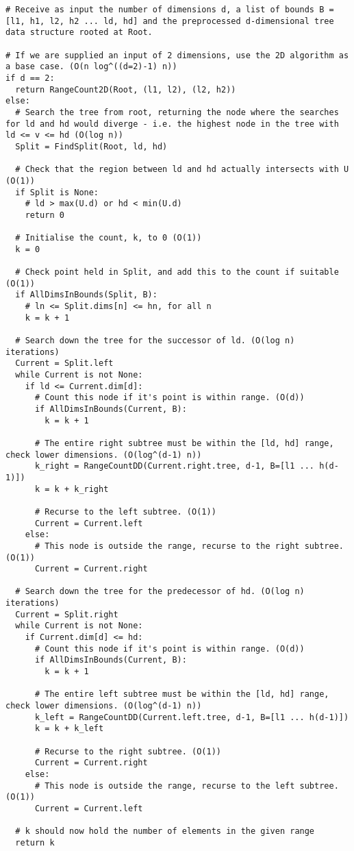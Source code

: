 \documentclass[paper=a4, fontsize=12pt]{article}
\begin{document}
\begin{lstlisting}
# Receive as input the number of dimensions d, a list of bounds B = [l1, h1, l2, h2 ... ld, hd] and the preprocessed d-dimensional tree data structure rooted at Root.

# If we are supplied an input of 2 dimensions, use the 2D algorithm as a base case. (O(n log^((d=2)-1) n))
if d == 2:
  return RangeCount2D(Root, (l1, l2), (l2, h2))
else:
  # Search the tree from root, returning the node where the searches for ld and hd would diverge - i.e. the highest node in the tree with ld <= v <= hd (O(log n))
  Split = FindSplit(Root, ld, hd)

  # Check that the region between ld and hd actually intersects with U (O(1))
  if Split is None:
    # ld > max(U.d) or hd < min(U.d)
    return 0

  # Initialise the count, k, to 0 (O(1))
  k = 0

  # Check point held in Split, and add this to the count if suitable (O(1))
  if AllDimsInBounds(Split, B):
    # ln <= Split.dims[n] <= hn, for all n
    k = k + 1

  # Search down the tree for the successor of ld. (O(log n) iterations)
  Current = Split.left
  while Current is not None:
    if ld <= Current.dim[d]:
      # Count this node if it's point is within range. (O(d))
      if AllDimsInBounds(Current, B):
        k = k + 1

      # The entire right subtree must be within the [ld, hd] range, check lower dimensions. (O(log^(d-1) n))
      k_right = RangeCountDD(Current.right.tree, d-1, B=[l1 ... h(d-1)])
      k = k + k_right

      # Recurse to the left subtree. (O(1))
      Current = Current.left
    else:
      # This node is outside the range, recurse to the right subtree. (O(1))
      Current = Current.right

  # Search down the tree for the predecessor of hd. (O(log n) iterations)
  Current = Split.right
  while Current is not None:
    if Current.dim[d] <= hd:
      # Count this node if it's point is within range. (O(d))
      if AllDimsInBounds(Current, B):
        k = k + 1

      # The entire left subtree must be within the [ld, hd] range, check lower dimensions. (O(log^(d-1) n))
      k_left = RangeCountDD(Current.left.tree, d-1, B=[l1 ... h(d-1)])
      k = k + k_left

      # Recurse to the right subtree. (O(1))
      Current = Current.right
    else:
      # This node is outside the range, recurse to the left subtree. (O(1))
      Current = Current.left

  # k should now hold the number of elements in the given range
  return k
\end{lstlisting}
\end{document}
